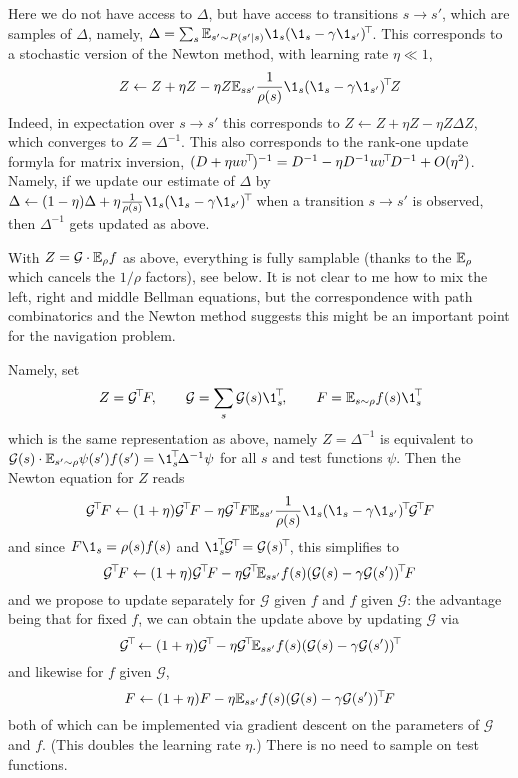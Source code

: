 \documentclass[11pt,a4paper]{article}
\newcommand{\green}{\mathcal{G}}
\begin{document}
Here we do not have access to $\Delta$, but have access to transitions
$s\to s'$, which are samples of
$\Delta$, namely, $\Delta=\sum_s\E_{s'\sim P(s'|s)} \1_s\transp{(\1_s-\gamma
\1_{s'})}$. This corresponds to a stochastic version of the Newton
method, with learning rate $\eta\ll 1$,
\begin{equation}
Z\gets Z+\eta Z-\eta Z \E_{ss'} \frac{1}{\rho(s)}\1_s\transp{(\1_s-\gamma \1_{s'})} Z
\end{equation}
Indeed, in expectation over $s\to s'$ this corresponds to $Z\gets Z+\eta
Z-\eta Z \Delta Z$, which converges to $Z=\Delta^{-1}$. This
also corresponds to the rank-one update formyla for matrix inversion,
$(D+\eta uv^{\!\top}\!)^{-1}=D^{-1}-\eta
D^{-1}uv^{\!\top}\!D^{-1}+O(\eta^2)$. Namely,
if we update our estimate of $\Delta$ by
$\Delta\gets (1-\eta)\Delta+\eta \frac{1}{\rho(s)} \1_s\transp{(\1_s-\gamma
\1_{s'})}$ when a transition $s\to s'$ is observed, then
$\Delta^{-1}$ gets updated as above.

With $Z=\green\cdot \E_{\rho} f$ as above, everything is fully samplable
(thanks to the $\mathbb{E}_\rho$ which cancels the $1/\rho$ factors), see below.
It is not clear to me how to mix the left, right and middle Bellman
equations, but the correspondence with path combinatorics and the Newton
method suggests this
might be an important point for the navigation problem.

Namely, set
\begin{equation}
Z=\transp{\green}F, \qquad \green=\sum_s \green(s)\transp{\1_s},\qquad F=\E_{s\sim
\rho}
f(s)\transp{\1_s}
\end{equation}
which is the same representation as above, namely $Z=\Delta^{-1}$ is
equivalent to $\green(s)\cdot \E_{s'\sim
\rho} \psi(s')f(s')=\transp{\1_s}\Delta^{-1}\psi$ for all $s$ and test
functions $\psi$. Then the Newton equation for $Z$ reads
\begin{equation}
\transp{\green}F\gets (1+\eta)\transp{\green}F-\eta \transp{\green}F \E_{ss'} \frac{1}{\rho(s)}\1_s\transp{(\1_s-\gamma
\1_{s'})} \transp{\green}F
\end{equation}
and since $F\1_s=\rho(s)f(s)$ and
$\transp{\1_s}\transp{\green}=\transp{\green(s)}$, this simplifies to
\begin{equation}
\transp{\green}F\gets (1+\eta)\transp{\green}F-\eta
\transp{\green} \E_{ss'} f(s)\transp{(\green(s)-\gamma
\green(s'))}F
\end{equation}
and we propose to update separately for $\green$ given $f$ and $f$ given
$\green$: the advantage being that for fixed $f$, we can obtain the
update above by updating $\green$ via
\begin{equation}
\transp{\green}\gets (1+\eta)\transp{\green}-\eta
\transp{\green} \E_{ss'} f(s)\transp{(\green(s)-\gamma
\green(s'))}
\end{equation}
and likewise for $f$ given $\green$,
\begin{equation}
F\gets (1+\eta)F-\eta
\E_{ss'} f(s)\transp{(\green(s)-\gamma
\green(s'))}F
\end{equation}
both of which can be implemented via gradient descent on the parameters
of $\green$ and $f$. (This doubles the learning rate $\eta$.)
There is no need to sample on test functions.
\end{document}
